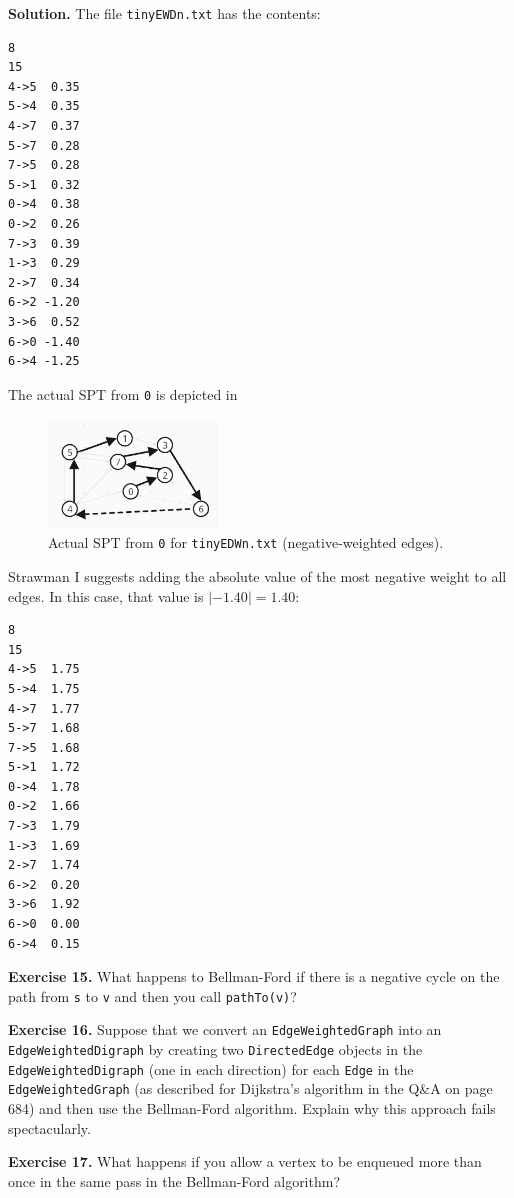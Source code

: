 \documentclass[12pt, a4paper]{article}
\newenvironment{ex}[2][Exercise]
{\par\medskip\noindent \textbf{#1 #2.}}
{\medskip}
\newenvironment{sol}[1][Solution]
{\par\medskip\noindent \textbf{#1.} }
{\medskip}
\begin{document}
	\begin{sol}
		The file \texttt{tinyEWDn.txt} has the contents:
		\begin{lstlisting}[language={}]
8
15
4->5  0.35
5->4  0.35
4->7  0.37
5->7  0.28
7->5  0.28
5->1  0.32
0->4  0.38
0->2  0.26
7->3  0.39
1->3  0.29
2->7  0.34
6->2 -1.20
3->6  0.52
6->0 -1.40
6->4 -1.25
		\end{lstlisting}
		The actual SPT from \texttt{0} is depicted in
		\begin{figure}
			\centering
			\includegraphics[width=0.4\textwidth]{exercise-14-actual-result}
			\caption{Actual SPT from \texttt{0} for \texttt{tinyEDWn.txt} (negative-weighted edges).}
		\end{figure}
		Strawman I suggests adding the absolute value of the most negative weight to
		all edges. In this case, that value is $|-1.40|=1.40$:
		\begin{lstlisting}[language={}]
8
15
4->5  1.75
5->4  1.75
4->7  1.77
5->7  1.68
7->5  1.68
5->1  1.72
0->4  1.78
0->2  1.66
7->3  1.79
1->3  1.69
2->7  1.74
6->2  0.20
3->6  1.92
6->0  0.00
6->4  0.15
		\end{lstlisting}
	\end{sol}
	\begin{ex}{15}
		What happens to Bellman-Ford if there is a negative cycle on the path from
		\texttt{s} to \texttt{v} and then you call \texttt{pathTo(v)}?
	\end{ex}
	\begin{ex}{16}
		Suppose that we convert an \texttt{EdgeWeightedGraph} into an \texttt{EdgeWeightedDigraph}
		by creating two \texttt{DirectedEdge} objects in the \texttt{EdgeWeightedDigraph}
		(one in each direction) for each \texttt{Edge} in the \texttt{EdgeWeightedGraph}
		(as described for Dijkstra's algorithm in the Q\&A on page 684) and then use the
		Bellman-Ford algorithm. Explain why this approach fails spectacularly.
	\end{ex}
	\begin{ex}{17}
		What happens if you allow a vertex to be enqueued more than once in the same pass
		in the Bellman-Ford algorithm?
	\end{ex}
\end{document}
